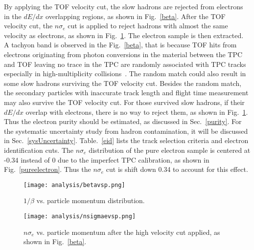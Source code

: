 By applying the TOF velocity cut, the slow hadrons are rejected from electrons in the $dE/dx$ overlapping regions, as shown in Fig.~\ref{beta}. After the TOF velocity cut, the $n\sigma_{e}$ cut is applied to reject hadrons with almost the same velocity as electrons, as shown in Fig.~\ref{nsigmae:cut}. The electron sample is then extracted. A tachyon band is observed in the Fig.~\ref{beta}, that is because TOF hits from electrons originating from photon conversions in the material between the TPC and TOF leaving no trace in the TPC are randomly associated with TPC tracks especially in high-multiplicity collisions~\cite{STAR:dielectron1,dielectronJie}. The random match could also result in some slow hadrons surviving the TOF velocity cut. Besides the random match, the secondary particles with inaccurate track length and flight time measurement may also survive the TOF velocity cut. For those survived slow hadrons, if their $dE/dx$ overlap with electrons, there is no way to reject them, as shown in Fig.~\ref{nsigmae:cut}. Thus the electron purity should be estimated, as discussed in Sec.~\ref{purity}. For the systematic uncertainty study from hadron contamination, it will be discussed in Sec.~\ref{sysUncertainty}. Table.~\ref{eid} lists the track selection criteria and electron identification cuts. The $n\sigma_{e}$ distribution of the pure electron sample is centered at -0.34 instead of 0 due to the imperfect TPC calibration, as shown in Fig.~\ref{pureelectron}. Thus the $n\sigma_{e}$ cut is shift down 0.34 to account for this effect.

\begin{figure}[htbp]
\begin{minipage}[htbp]{0.48\linewidth}
\centering
\texttt{[image: analysis/betavsp.png]}
\caption{$1/\beta$ vs. particle momentum distribution.\label{beta}}
\end{minipage}
\hfill
\begin{minipage}[htbp]{0.48\linewidth}
\centering
\texttt{[image: analysis/nsigmaevsp.png]} 
\caption{$n\sigma_{e}$ vs. particle momentum after the high velocity cut applied, as shown in Fig.~\ref{beta}.\label{nsigmae:cut}}
\end{minipage}
\end{figure}

